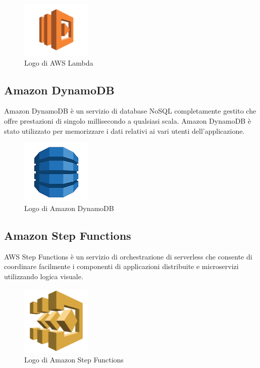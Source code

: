 \begin{figure}[h]
  \centering
  \includegraphics[width=0.3\textwidth]{img/tecnologie/AWS_Lambda.png}
  \caption{Logo di AWS Lambda}
  \label{fig:lambda}
\end{figure}

\subsection{Amazon DynamoDB}
Amazon DynamoDB è un servizio di database NoSQL completamente gestito che offre prestazioni di singolo millisecondo a qualsiasi scala. Amazon DynamoDB è stato utilizzato per memorizzare i dati relativi ai vari utenti dell'applicazione.

\begin{figure}[h]
  \centering
  \includegraphics[width=0.3\textwidth]{img/tecnologie/DynamoDB.png}
  \caption{Logo di Amazon DynamoDB}
  \label{fig:dynamodb}
\end{figure}

\subsection{Amazon Step Functions}
AWS Step Functions è un servizio di orchestrazione di serverless che consente di coordinare facilmente i componenti di applicazioni distribuite e microservizi utilizzando logica visuale. 

\begin{figure}[h]
  \centering
  \includegraphics[width=0.3\textwidth]{img/tecnologie/stepfunctions.png}
  \caption{Logo di Amazon Step Functions}
  \label{fig:stepfunctions}
\end{figure}

